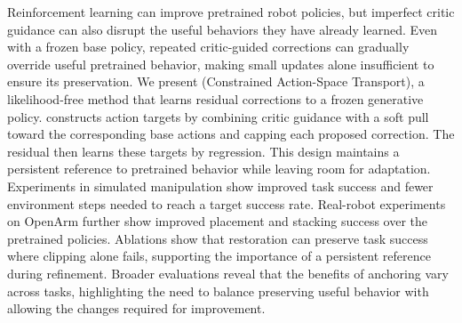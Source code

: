 Reinforcement learning can improve pretrained robot policies, but imperfect critic guidance can also disrupt the useful behaviors they have already learned. 
Even with a frozen base policy, repeated critic-guided corrections can gradually override useful pretrained behavior, making small updates alone insufficient to ensure its preservation. 
We present \method{} (Constrained Action-Space Transport), a likelihood-free method that learns residual corrections to a frozen generative policy. 
\method{} constructs action targets by combining critic guidance with a soft pull toward the corresponding base actions and capping each proposed correction. 
The residual then learns these targets by regression. 
This design maintains a persistent reference to pretrained behavior while leaving room for adaptation. 
Experiments in simulated manipulation show improved task success and fewer environment steps needed to reach a target success rate. 
Real-robot experiments on OpenArm further show improved placement and stacking success over the pretrained policies. 
Ablations show that restoration can preserve task success where clipping alone fails, supporting the importance of a persistent reference during refinement. 
Broader evaluations reveal that the benefits of anchoring vary across tasks, highlighting the need to balance preserving useful behavior with allowing the changes required for improvement.


